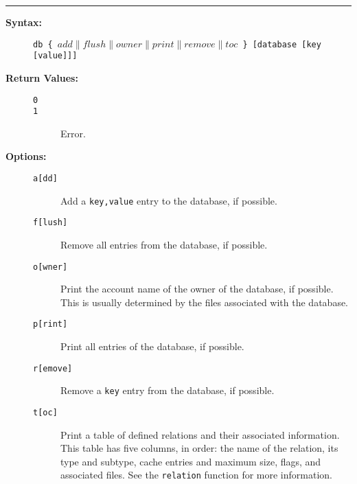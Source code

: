 \hrule
\begin{description}
\item[{\bf Syntax:}] \mbox{}

{\tt db \{ $add\|flush\|owner\|print\|remove\|toc$ \} [database [key [value]]]}



\item[{\bf Return Values:}] \mbox{}

\begin{description}
\item[{\tt 0}] \mbox{}



\item[{\tt 1}] \mbox{}

Error.

\end{description}


\item[{\bf Options:}] \mbox{}

\begin{description}
\item[{\tt a[dd]}] \mbox{}

Add a {\tt key,value} 
entry to the database, if possible.

\item[{\tt f[lush]}] \mbox{}

Remove all entries from the database, 
if possible.

\item[{\tt o[wner]}] \mbox{}

Print the account name of the owner 
of the database, if possible. This is usually determined by the 
files associated with the database.

\item[{\tt p[rint]}] \mbox{}

Print all entries of the database, 
if possible. 

\item[{\tt r[emove]}] \mbox{}

Remove a {\tt key} entry 
from the database, if possible.

\item[{\tt t[oc]}] \mbox{}

Print a table of defined relations 
and their associated information. This table has five columns, 
in order: the name of the relation, its type and subtype, cache 
entries and maximum size, flags, and associated files. See the 
{\tt relation} function for more information.


\end{description}
\end{description}

